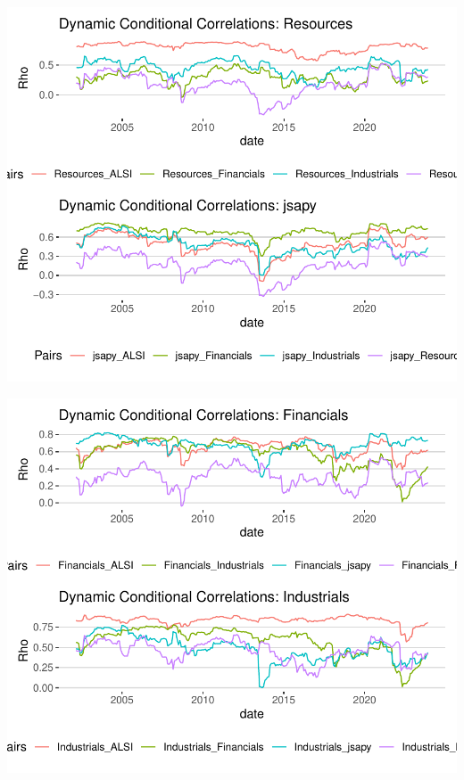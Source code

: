 \documentclass[12pt,preprint, authoryear]{elsarticle}
\let\origfigure\figure
\let\endorigfigure\endfigure
\renewenvironment{figure}[1][2] {
    \expandafter\origfigure\expandafter[H]
} {
    \endorigfigure
}
\numberwithin{equation}{section}
\numberwithin{figure}{section}
\numberwithin{table}{section}
\begin{document}
\begin{figure}[H]

{\centering \includegraphics{DCC_GARCH_22582053_files/figure-latex/Figure4-1} 

}

\caption{Dynamic Conditional Correlations: Resources and jsapy \label{Figure4}}\label{fig:Figure4}
\end{figure}

\begin{figure}[H]

{\centering \includegraphics{DCC_GARCH_22582053_files/figure-latex/Figure5-1} 

}

\caption{Dynamic Conditional Correlations: Financials and Industrials \label{Figure5}}\label{fig:Figure5}
\end{figure}
\end{document}
